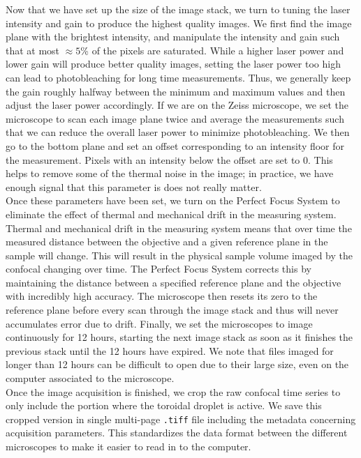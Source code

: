 Now that we have set up the size of the image stack, we turn to tuning the laser intensity and gain to produce the highest quality images.
We first find the image plane with the brightest intensity, and manipulate the intensity and gain such that at most $\approx 5$\%  of the pixels are saturated.
While a higher laser power and lower gain will produce better quality images, setting the laser power too high can lead to photobleaching for long time measurements.
Thus, we generally keep the gain roughly halfway between the minimum and maximum values and then adjust the laser power accordingly.
If we are on the Zeiss microscope, we set the microscope to scan each image plane twice and average the measurements such that we can reduce the overall laser power to minimize photobleaching.
We then go to the bottom plane and set an offset corresponding to an intensity floor for the measurement.
Pixels with an intensity below the offset are set to 0.
This helps to remove some of the thermal noise in the image; in practice, we have enough signal that this parameter is does not really matter.\\

Once these parameters have been set, we turn on the Perfect Focus System to eliminate the effect of thermal and mechanical drift in the measuring system.
Thermal and mechanical drift in the measuring system means that over time the measured distance between the objective and a given reference plane in the sample will change.
This will result in the physical sample volume imaged by the confocal changing over time.
The Perfect Focus System corrects this by maintaining the distance between a specified reference plane and the objective with incredibly high accuracy.
The microscope then resets its zero to the reference plane before every scan through the image stack and thus will never accumulates error due to drift.
Finally, we set the microscopes to image continuously for 12 hours, starting the next image stack as soon as it finishes the previous stack until the 12 hours have expired.
We note that files imaged for longer than 12 hours can be difficult to open due to their large size, even on the computer associated to the microscope.\\

Once the image acquisition is finished, we crop the raw confocal time series to only include the portion where the toroidal droplet is active.
We save this cropped version in single multi-page \texttt{.tiff} file including the metadata concerning acquisition parameters.
This standardizes the data format between the different microscopes to make it easier to read in to the computer.



